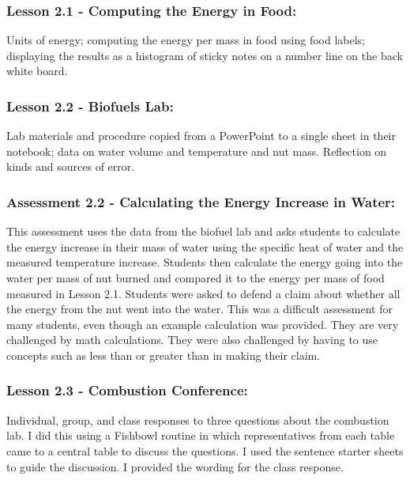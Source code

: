 \documentclass[11pt]{article}
\begin{document}
\subsubsection{Lesson 2.1 - Computing the Energy in Food:}
\label{sec:org2fd7ca3}

Units of energy; computing the energy per
mass in food using food labels; displaying the results as a histogram of sticky notes on a
number line on the back white board.


\subsubsection{Lesson 2.2 - Biofuels Lab:}
\label{sec:org68e27cc}

Lab materials and procedure copied from a PowerPoint to a
single sheet in their notebook; data on water volume and temperature and nut mass.
Reflection on kinds and sources of error.


\subsubsection{Assessment 2.2 - Calculating the Energy Increase in Water:}
\label{sec:org563645c}

This assessment uses the data from the biofuel lab and asks students to calculate the energy increase in their mass of water
using the specific heat of water and the measured temperature increase. Students then
calculate the energy going into the water per mass of nut burned and compared it to the energy
per mass of food measured in Lesson 2.1. Students were asked to defend a claim about
whether all the energy from the nut went into the water. This was a difficult assessment for
many students, even though an example calculation was provided. They are very challenged by
math calculations. They were also challenged by having to use concepts such as less than or
greater than in making their claim.


\subsubsection{Lesson 2.3 - Combustion Conference:}
\label{sec:orgbfb3671}

Individual, group, and class responses to three questions about the combustion lab. I did this using a Fishbowl routine in which
representatives from each table came to a central table to discuss the questions. I used
the sentence starter sheets to guide the discussion. I provided the wording for the class
response.
\end{document}
